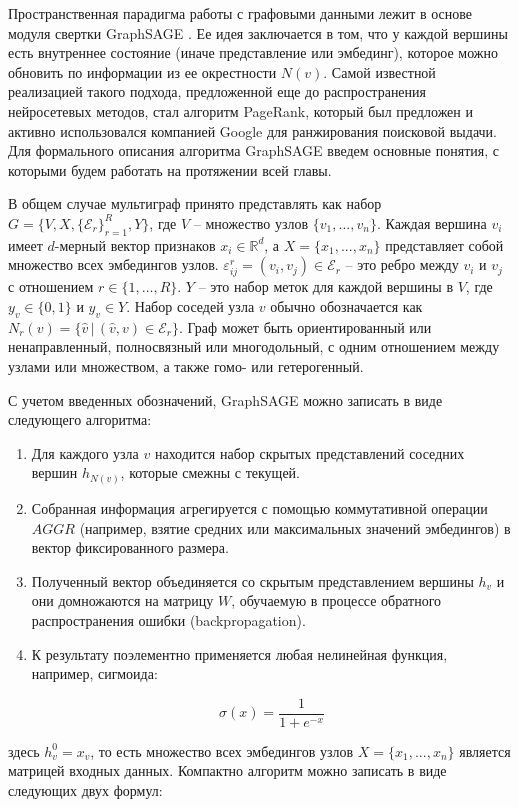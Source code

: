 Пространственная парадигма работы с графовыми данными лежит в основе модуля свертки GraphSAGE \cite{hamilton2017}. Ее идея заключается в том, что у каждой вершины есть внутреннее состояние (иначе представление или эмбединг), которое можно обновить по информации из ее окрестности \(N(v)\). Самой известной реализацией такого подхода, предложенной еще до распространения нейросетевых методов, стал алгоритм PageRank, который был предложен и активно использовался компанией Google для ранжирования поисковой выдачи. Для формального описания алгоритма GraphSAGE введем основные понятия, с которыми будем работать на протяжении всей главы.

В общем случае мультиграф принято представлять как набор \(G = \{V, X, \{\mathcal{E}_r\}_{r=1}^R, Y\}\), где \(V\) -- множество узлов \(\{v_1, ..., v_n\}\). Каждая вершина \(v_i\) имеет \(d\)-мерный вектор признаков \(x_i \in \mathbb{R}^d\), а \(X = \{x_1, . . . , x_n\}\) представляет собой множество всех эмбедингов узлов. \(\varepsilon_{ij}^r = (v_i , v_j) \in \mathcal{E}_r\) -- это ребро между \(v_i\) и \(v_j\) с отношением \(r \in \{1, \ldots , R\}\). \(Y\) -- это набор меток для каждой вершины в \(V\), где \(y_v \in \{0, 1\}\) и \(y_v \in Y \). Набор соседей узла \(v\) обычно обозначается как \(N_r(v) = \{\hat{v} \,|\, (\hat{v}, v) \in \mathcal{E}_r\} \). Граф может быть ориентированный или ненаправленный, полносвязный или многодольный, с одним отношением между узлами или множеством, а также гомо- или гетерогенный.

С учетом введенных обозначений, GraphSAGE можно записать в виде следующего алгоритма:

\begin{enumerate}
    \item Для каждого узла \(v\) находится набор скрытых представлений соседних вершин \(h_{N(v)}\), которые смежны с текущей.

    \item Собранная информация агрегируется с помощью коммутативной операции \(AGGR\) (например, взятие средних или максимальных значений эмбедингов) в вектор фиксированного размера.

    \item Полученный вектор объединяется со скрытым представлением вершины \(h_v\) и они домножаются на матрицу \(W\), обучаемую в процессе обратного распространения ошибки (backpropagation).

    \item К результату поэлементно применяется любая нелинейная функция, например, сигмоида:

    \begin{equation}
        \sigma(x) = \frac{1}{1 + e^{-x}}
    \end{equation}
\end{enumerate}
здесь \(h_v^0 = x_v\), то есть множество всех эмбедингов узлов \(X = \{x_1, . . . , x_n\}\) является матрицей входных данных. Компактно алгоритм можно записать в виде следующих двух формул:

